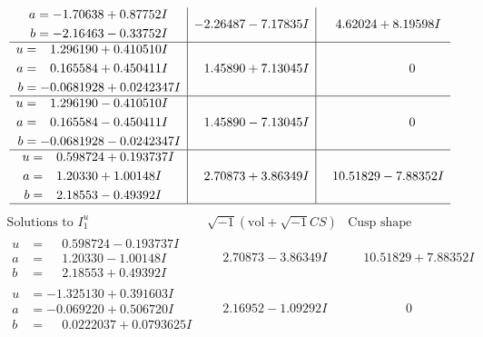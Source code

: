 \documentclass[1p]{elsarticle_modified}
\theoremstyle{definition}
\newcommand{\I}{\sqrt{-1}}
\begin{document}
$$\begin{array}{c|c|c}
\begin{aligned}
a &= -1.70638 + 0.87752 I \\
b &= -2.16463 - 0.33752 I\end{aligned}
 & -2.26487 - 7.17835 I & \phantom{-}4.62024 + 8.19598 I \\ \hline\begin{aligned}
u &= \phantom{-}1.296190 + 0.410510 I \\
a &= \phantom{-}0.165584 + 0.450411 I \\
b &= -0.0681928 + 0.0242347 I\end{aligned}
 & \phantom{-}1.45890 + 7.13045 I & \phantom{-0.000000 } 0 \\ \hline\begin{aligned}
u &= \phantom{-}1.296190 - 0.410510 I \\
a &= \phantom{-}0.165584 - 0.450411 I \\
b &= -0.0681928 - 0.0242347 I\end{aligned}
 & \phantom{-}1.45890 - 7.13045 I & \phantom{-0.000000 } 0 \\ \hline\begin{aligned}
u &= \phantom{-}0.598724 + 0.193737 I \\
a &= \phantom{-}1.20330 + 1.00148 I \\
b &= \phantom{-}2.18553 - 0.49392 I\end{aligned}
 & \phantom{-}2.70873 + 3.86349 I & \phantom{-}10.51829 - 7.88352 I\\
 \hline 
 \end{array}$$\newpage$$\begin{array}{c|c|c}  
\text{Solutions to }I^u_{1}& \I (\text{vol} + \sqrt{-1}CS) & \text{Cusp shape}\\
 \hline 
\begin{aligned}
u &= \phantom{-}0.598724 - 0.193737 I \\
a &= \phantom{-}1.20330 - 1.00148 I \\
b &= \phantom{-}2.18553 + 0.49392 I\end{aligned}
 & \phantom{-}2.70873 - 3.86349 I & \phantom{-}10.51829 + 7.88352 I \\ \hline\begin{aligned}
u &= -1.325130 + 0.391603 I \\
a &= -0.069220 + 0.506720 I \\
b &= \phantom{-}0.0222037 + 0.0793625 I\end{aligned}
 & \phantom{-}2.16952 - 1.09292 I & \phantom{-0.000000 } 0 \\ \hline\begin{aligned}

\end{aligned}
\end{array}$$
\end{document}
